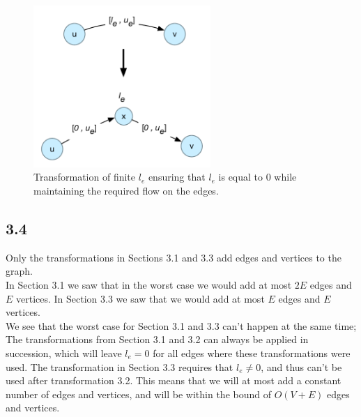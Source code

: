 \documentclass[12pt]{article}
\begin{document}
\begin{figure}[h]
  \centering
    \includegraphics[width=0.6\textwidth]{figures/e3_3}
  \caption{Transformation of finite $l_e$ ensuring that $l_e$ is equal to 0 while maintaining the required flow on the edges.}
  \label{fig:e3_3}
\end{figure}

\subsection{3.4}
Only the transformations in Sections 3.1 and 3.3 add edges and vertices to the graph.\\
In Section 3.1 we saw that in the worst case we would add at most $2E$ edges and $E$ vertices. In Section 3.3 we saw that we would add at most $E$ edges and $E$ vertices.\\
We see that the worst case for Section 3.1 and 3.3 can't happen at the same time; The transformations from Section 3.1 and 3.2 can always be applied in succession, which will leave $l_e = 0$ for all edges where these transformations were used. The transformation in Section 3.3 requires that $l_e \ne 0$, and thus can't be used after transformation 3.2. This means that we will at most add a constant number of edges and vertices, and will be within the bound of $O(V+E)$ edges and vertices.
\end{document}
